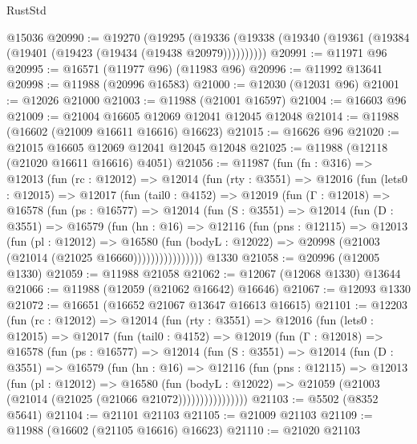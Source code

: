 \begin{lexlean}{RustStd}
\begin{coremodule}
    @15036
@20990 := @19270
    (@19295 (@19336 (@19338 (@19340 (@19361 (@19384 (@19401 (@19423 (@19434 (@19438 @20979))))))))))
@20991 := @11971 @96
@20995 := @16571 (@11977 @96) (@11983 @96)
@20996 := @11992 @13641
@20998 := @11988 (@20996 @16583)
@21000 := @12030 (@12031 @96)
@21001 := @12026 @21000
@21003 := @11988 (@21001 @16597)
@21004 := @16603 @96
@21009 := @21004 @16605 @12069 @12041 @12045 @12048
@21014 := @11988 (@16602 (@21009 @16611 @16616) @16623)
@21015 := @16626 @96
@21020 := @21015 @16605 @12069 @12041 @12045 @12048
@21025 := @11988 (@12118 (@21020 @16611 @16616) @4051)
@21056 := @11987
    (fun (fn : @316) =>
    @12013
      (fun (rc : @12012) =>
      @12014
        (fun (rty : @3551) =>
        @12016
          (fun (lets0 : @12015) =>
          @12017
            (fun (tail0 : @4152) =>
            @12019
              (fun (Γ : @12018) =>
              @16578
                (fun (ps : @16577) =>
                @12014
                  (fun (S : @3551) =>
                  @12014
                    (fun (D : @3551) =>
                    @16579
                      (fun (hn : @16) =>
                      @12116
                        (fun (pns : @12115) =>
                        @12013
                          (fun (pl : @12012) =>
                          @16580
                            (fun (bodyL : @12022) =>
                            @20998 (@21003 (@21014 (@21025 @16660))))))))))))))))
    @1330
@21058 := @20996 (@12005 @1330)
@21059 := @11988 @21058
@21062 := @12067 (@12068 @1330) @13644
@21066 := @11988 (@12059 (@21062 @16642) @16646)
@21067 := @12093 @1330
@21072 := @16651 (@16652 @21067 @13647 @16613 @16615)
@21101 := @12203
    (fun (rc : @12012) =>
    @12014
      (fun (rty : @3551) =>
      @12016
        (fun (lets0 : @12015) =>
        @12017
          (fun (tail0 : @4152) =>
          @12019
            (fun (Γ : @12018) =>
            @16578
              (fun (ps : @16577) =>
              @12014
                (fun (S : @3551) =>
                @12014
                  (fun (D : @3551) =>
                  @16579
                    (fun (hn : @16) =>
                    @12116
                      (fun (pns : @12115) =>
                      @12013
                        (fun (pl : @12012) =>
                        @16580
                          (fun (bodyL : @12022) =>
                          @21059 (@21003 (@21014 (@21025 (@21066 @21072))))))))))))))))
@21103 := @5502 (@8352 @5641)
@21104 := @21101 @21103
@21105 := @21009 @21103
@21109 := @11988 (@16602 (@21105 @16616) @16623)
@21110 := @21020 @21103

\end{coremodule}
\end{lexlean}
